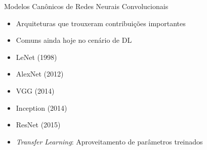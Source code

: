 \begin{frame}{\LARGE{Modelos Canônicos de Redes Neurais Convolucionais}}
   \ \  \\[0.1cm]
   \begin{itemize}
     \item Arquiteturas que trouxeram contribuições importantes
     \item Comuns ainda hoje no cenário de DL
     \ \ \newline
     \item LeNet (1998)
     \item AlexNet (2012)
     \item VGG (2014)
     \item Inception (2014)
     \item ResNet (2015)
     \ \ \newline
     \item \emph{Transfer Learning}: Aproveitamento de parâmetros treinados
   \end{itemize}
\end{frame}
